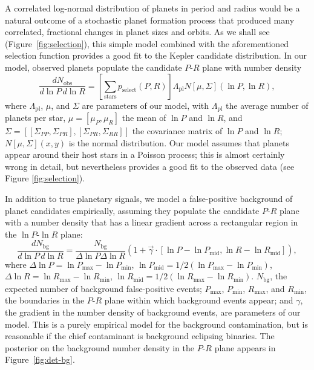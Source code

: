 \documentclass[12pt]{article}
\newcommand{\Rpl}{\Lambda_\mathrm{pl}}
\newcommand{\Nbg}{N_\mathrm{bg}}
\begin{document}
A correlated log-normal distribution of planets in period and radius
would be a natural outcome of a stochastic planet formation process
that produced many correlated, fractional changes in planet sizes and
orbits.  As we shall see (Figure\ \ref{fig:selection}), this simple
model combined with the aforementioned selection function provides a
good fit to the Kepler candidate distribution.  In our model, observed
planets populate the candidate $P$-$R$ plane with number density
\begin{equation}
  \label{eq:foreground-rate}
  \frac{dN_\mathrm{obs}}{d\ln P\, d\ln R} = \left[ \sum_\mathrm{stars}
    p_\mathrm{select}(P, R) \right] \Rpl N\left[ \mu, \Sigma
    \right]\left( \ln P, \ln R \right),
\end{equation}
where $\Rpl$, $\mu$, and $\Sigma$ are parameters of our model, with
$\Rpl$ the average number of planets per star, $\mu = \left[ \mu_P,
  \mu_R \right]$ the mean of $\ln P$ and $\ln R$, and $\Sigma = \left[
  \left[ \Sigma_{PP}, \Sigma_{PR} \right], \left[ \Sigma_{PR},
    \Sigma_{RR} \right]\right]$ the covariance matrix of $\ln P$ and
$\ln R$; $N\left[ \mu, \Sigma \right](x,y)$ is the normal
distribution.  Our model assumes that planets appear around their host
stars in a Poisson process; this is almost certainly wrong in
detail\cite{Weissbein2012}, but nevertheless provides a good fit to
the observed data (see Figure \ref{fig:selection}).

In addition to true planetary signals, we model a false-positive
background of planet candidates empirically, assuming they populate
the candidate $P$-$R$ plane with a number density that has a linear
gradient across a rectangular region in the $\ln P$-$\ln R$ plane:
\begin{equation}
  \label{eq:background-rate}
  \frac{d\Nbg}{d \ln P \, d \ln R} = \frac{\Nbg}{\Delta \ln P \Delta
    \ln R} \left( 1 + \vec{\gamma} \cdot \left[ \ln P - \ln P_\mathrm{mid} , \ln
    R - \ln R_\mathrm{mid} \right] \right),
\end{equation}
where $\Delta \ln P = \ln P_\mathrm{max} - \ln P_\mathrm{min}$, $\ln
P_\mathrm{mid} = 1/2\left(\ln P_\mathrm{max} - \ln P_\mathrm{min}
\right)$, $\Delta \ln R = \ln R_\mathrm{max} - \ln R_\mathrm{min}$,
$\ln R_\mathrm{mid} = 1/2\left(\ln R_\mathrm{max} - \ln R_\mathrm{min}
\right)$.  $\Nbg$, the expected number of background false-positive
events; $P_\mathrm{max}$, $P_\mathrm{min}$, $R_\mathrm{max}$, and
$R_\mathrm{min}$, the boundaries in the $P$-$R$ plane within which
background events appear; and $\gamma$, the gradient in the number
density of background events, are parameters of our model.  This is a
purely empirical model for the background contamination, but is
reasonable if the chief contaminant is background eclipsing
binaries\cite{Fressin2013,Duquennoy1991}.  The posterior on the
background number density in the $P$-$R$ plane appears in
Figure\ \ref{fig:det-bg}.
\end{document}
